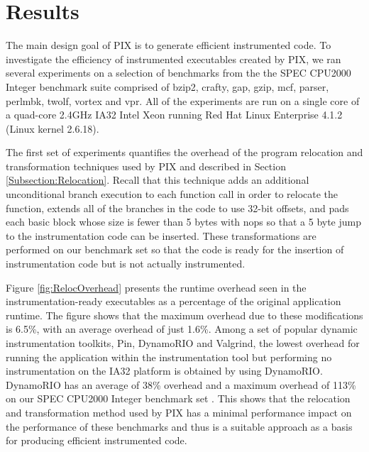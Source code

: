 \section{Results}
\label{sec:Results}

The main design goal of PIX is to generate efficient instrumented code. 
To investigate the efficiency of instrumented executables created by PIX, we ran several experiments 
on a selection of benchmarks from the the SPEC CPU2000 Integer benchmark suite comprised of
bzip2, crafty, gap, gzip, mcf, parser, perlmbk, twolf, vortex and vpr. All of the experiments are run on a
single core of a quad-core 2.4GHz IA32 Intel Xeon running Red Hat Linux Enterprise 4.1.2 (Linux kernel 2.6.18). 

The first set of experiments quantifies the overhead of the program relocation and 
transformation techniques used by PIX and
described in Section \ref{Subsection:Relocation}. 
Recall that this technique adds an additional unconditional
branch execution to each function call in order to relocate the function, extends all of the branches in the code
to use 32-bit offsets, and pads each basic block whose size is fewer than 5 bytes with nops so that a
5 byte jump to the instrumentation code can be inserted. These transformations are performed on our benchmark set 
so that the code is ready for the insertion of instrumentation code but is not actually instrumented. 

Figure \ref{fig:RelocOverhead} presents
the runtime overhead seen in the instrumentation-ready executables as a percentage of the original application runtime.
The figure shows that the maximum overhead due to these modifications is 6.5\%, with an
average overhead of just 1.6\%. Among a set of popular dynamic instrumentation toolkits,
Pin, DynamoRIO and Valgrind, the lowest overhead for running the application within the instrumentation
tool but performing no instrumentation
on the IA32 platform is obtained by using DynamoRIO. DynamoRIO has an average of 38\% overhead and a maximum overhead of 113\% on
our SPEC CPU2000 Integer benchmark set \cite{luk2005pin}. This shows that the 
relocation and transformation method used by PIX has a minimal
performance impact on the performance of these benchmarks and thus is a suitable approach as a basis for
producing efficient instrumented code.

